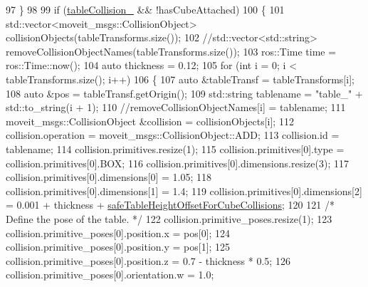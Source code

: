 \begin{DoxyCode}
97                     \}
98 
99                     \textcolor{keywordflow}{if} (\hyperlink{classsm__moveit__4_1_1cl__perception__system_1_1CpSimulatedGazeboPerception_a64beecc85d97c62bc4f884f4601d9c6a}{tableCollision\_} && !hasCubeAttached)
100                     \{
101                         std::vector<moveit\_msgs::CollisionObject> collisionObjects(tableTransforms.size());
102                         \textcolor{comment}{//std::vector<std::string> removeCollisionObjectNames(tableTransforms.size());}
103                         ros::Time time = ros::Time::now();
104                         \textcolor{keyword}{auto} thickness = 0.12;
105                         \textcolor{keywordflow}{for} (\textcolor{keywordtype}{int} i = 0; i < tableTransforms.size(); i++)
106                         \{
107                             \textcolor{keyword}{auto} &tableTransf = tableTransforms[i];
108                             \textcolor{keyword}{auto} &pos = tableTransf.getOrigin();
109                             std::string tablename = \textcolor{stringliteral}{"table\_"} + std::to\_string(i + 1);
110                             \textcolor{comment}{//removeCollisionObjectNames[i] = tablename;}
111                             moveit\_msgs::CollisionObject &collision = collisionObjects[i];
112                             collision.operation = moveit\_msgs::CollisionObject::ADD;
113                             collision.id = tablename;
114                             collision.primitives.resize(1);
115                             collision.primitives[0].type = collision.primitives[0].BOX;
116                             collision.primitives[0].dimensions.resize(3);
117                             collision.primitives[0].dimensions[0] = 1.05;
118                             collision.primitives[0].dimensions[1] = 1.4;
119                             collision.primitives[0].dimensions[2] = 0.001 + thickness + 
      \hyperlink{classsm__moveit__4_1_1cl__perception__system_1_1CpSimulatedGazeboPerception_a6b6bafbddde1f72c81bf54aa75872151}{safeTableHeightOffsetForCubeCollisions};
120 
121                             \textcolor{comment}{/* Define the pose of the table. */}
122                             collision.primitive\_poses.resize(1);
123                             collision.primitive\_poses[0].position.x = pos[0];
124                             collision.primitive\_poses[0].position.y = pos[1];
125                             collision.primitive\_poses[0].position.z = 0.7 - thickness * 0.5;
126                             collision.primitive\_poses[0].orientation.w = 1.0;

\end{DoxyCode}
